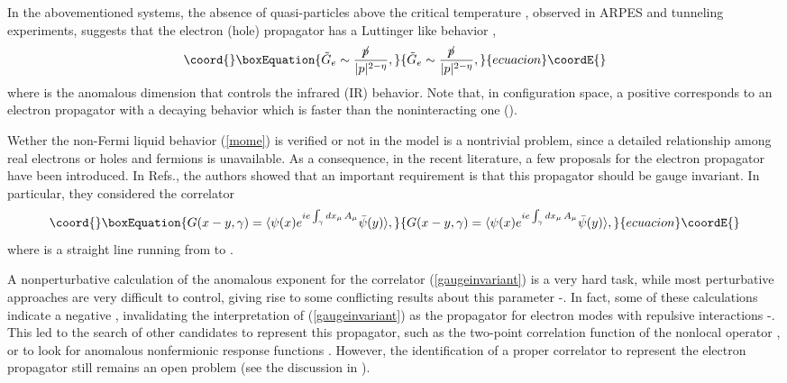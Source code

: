 \documentclass[a4paper,12pt]{article}
\begin{document}
In the abovementioned systems, the absence of quasi-particles above the critical temperature \coordHE{}, observed in ARPES and tunneling experiments, suggests that the electron (hole) propagator has a Luttinger like behavior \cite{rw1},
\begin{equation}\coord{}\boxEquation{
\tilde{G}_{e}\sim \frac{\not\! p~~~}{|p|^{2-\eta}},
\label{mome}
}{
\tilde{G}_{e}\sim \frac{\not\! p~~~}{|p|^{2-\eta}},
}{ecuacion}\coordE{}\end{equation}
where \coordHE{} is the anomalous dimension that controls the infrared (IR) behavior. Note that, in configuration space, a positive \myHighlight{$\eta$}\coordHE{} corresponds to an electron propagator with a decaying behavior which is faster than the noninteracting one (\coordHE{}). 

Wether the non-Fermi liquid behavior (\ref{mome}) is verified or not in the \coordHE{} model is  a nontrivial problem, since a detailed relationship among real electrons or holes and \coordHE{} fermions is unavailable. As a consequence, in the recent literature, a few proposals for the electron propagator have been introduced. In Refs.\cite{rw1,rw2}, the authors showed that an important requirement is that this propagator should be gauge invariant. In particular, they 
considered the correlator
\begin{equation}\coord{}\boxEquation{
G(x-y,\gamma)=\langle \psi(x)e^{ie\int_\gamma dx_\mu\, A_\mu} \bar{\psi}(y) \rangle, 
\label{gaugeinvariant}
}{
G(x-y,\gamma)=\langle \psi(x)e^{ie\int_\gamma dx_\mu\, A_\mu} \bar{\psi}(y) \rangle, 
}{ecuacion}\coordE{}\end{equation}
where \myHighlight{$\gamma$}\coordHE{} is a straight line running from \coordHE{} to \coordHE{}.

A nonperturbative calculation of the anomalous exponent \myHighlight{$\eta$}\coordHE{} for the correlator (\ref{gaugeinvariant}) is a very hard task, while most perturbative approaches are very difficult to control, giving rise to some conflicting results about this parameter \cite{rw1}-\cite{gkr}. In fact, some of these calculations indicate a negative \myHighlight{$\eta$}\coordHE{}, invalidating the interpretation of (\ref{gaugeinvariant}) as the propagator for electron modes with repulsive interactions \cite{rw2}-\cite{gkr}. This led to the search of other candidates to represent this propagator, such as the two-point correlation function of the nonlocal operator \coordHE{} \cite{k1}, or to look for anomalous nonfermionic response functions \cite{fpst}. However, the identification of a proper correlator to represent the electron propagator still remains an open problem (see the discussion in \cite{gkr}).
\end{document}
